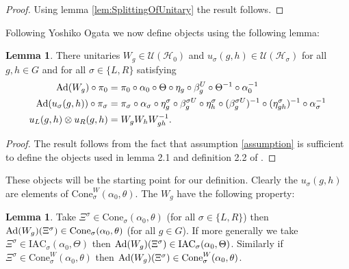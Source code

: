 \documentclass[12pt,a4paper,twoside]{article}
\newcommand{\IAC}{\textrm{IAC}}
\let\originalleft\left
\let\originalright\right
\renewcommand{\left}{\mathopen{}\mathclose\bgroup\originalleft}
\renewcommand{\right}{\aftergroup\egroup\originalright}
\newcommand{\UU}{\mathcal U}
\newcommand{\HH}{\mathcal H}
\newcommand{\Ad}[1]{\textrm{Ad}\left(#1\right)}
\theoremstyle{definition}
\newtheorem{lemma}[theorem]{Lemma}
\numberwithin{equation}{section}
\begin{document}
\begin{proof}
Using lemma \ref{lem:SplittingOfUnitary} the result follows.
\end{proof}
Following Yoshiko Ogata \cite{ogata2021h3gmathbb} we now define objects using the following lemma:
\begin{lemma}\label{lem:Definition_W_And_u}
	There unitaries $W_g\in\UU(\HH_0)$ and $u_{\sigma}(g,h)\in\UU(\HH_{\sigma})$ for all $g,h\in G$ and for all $\sigma\in\{L,R\}$ satisfying
	\begin{align}
		\Ad{W_g}\circ\pi_0&=\pi_0\circ\alpha_0\circ\Theta\circ\eta_g\circ\beta_g^U\circ\Theta^{-1}\circ\alpha_0^{-1}\\
		\Ad{u_\sigma(g,h)}\circ\pi_\sigma&=\pi_\sigma\circ\alpha_\sigma\circ\eta_g^\sigma\circ\beta_g^{\sigma U}\circ\eta_h^{\sigma}\circ(\beta_g^{\sigma U})^{-1}\circ(\eta^\sigma_{gh})^{-1}\circ\alpha_\sigma^{-1}\\
		u_L(g,h)\otimes u_R(g,h)&=W_gW_hW_{gh}^{-1}.
	\end{align}
\end{lemma}
\begin{proof}
	The result follows from the fact that assumption \ref{assumption} is sufficient to define the objects used in lemma 2.1 and definition 2.2 of \cite{ogata2021h3gmathbb}.
\end{proof}
These objects will be the starting point for our definition. Clearly the $u_\sigma(g,h)$ are elements of $\textrm{Cone}_\sigma^W(\alpha_0,\theta)$. The $W_g$ have the following property:
\begin{lemma}\label{lem:AdjointOverConeIsInCone}
	Take $\Xi^{\sigma}\in\textrm{Cone}_\sigma(\alpha_0,\theta)$ (for all $\sigma\in\{L,R\}$) then $\Ad{W_g}(\Xi^\sigma)\in\textrm{Cone}_\sigma(\alpha_0,\theta)$ (for all $g\in G$).	If more generally we take $\Xi^\sigma\in\IAC_\sigma(\alpha_0,\Theta)$ then $\Ad{W_g}(\Xi^\sigma)\in\IAC_\sigma(\alpha_0,\Theta)$. Similarly if $\Xi^{\sigma}\in\textrm{Cone}_\sigma^W(\alpha_0,\theta)$ then $\Ad{W_g}(\Xi^\sigma)\in\textrm{Cone}_\sigma^W(\alpha_0,\theta)$.
\end{lemma}
\end{document}

